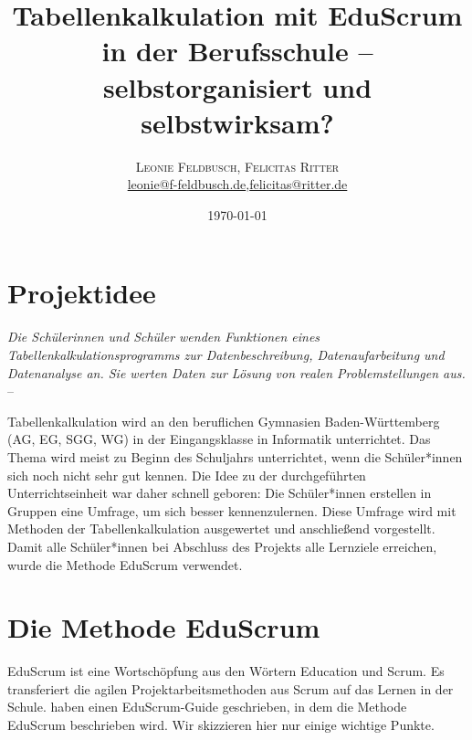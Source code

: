 \documentclass[twoside,twocolumn]{article}
\title{Tabellenkalkulation mit EduScrum in der Berufsschule -- selbstorganisiert und selbstwirksam?} %
\author{%
\textsc{Leonie Feldbusch, Felicitas Ritter} \\[1ex] %
\normalsize \href{mailto:leonie@f-feldbusch.de}{leonie@f-feldbusch.de},\href{mailto:felicitas@ritter.de}{felicitas@ritter.de} %
}
\date{\today} %
\begin{document}
\maketitle


\section{Projektidee}

\textit{Die Schülerinnen und Schüler wenden Funktionen eines Tabellenkalkulationsprogramms zur Datenbeschreibung, Datenaufarbeitung und Datenanalyse an. Sie werten Daten zur Lösung von realen Problemstellungen aus.} -- \cite{BP}

Tabellenkalkulation wird an den beruflichen Gymnasien Baden-Württemberg (AG, EG, SGG, WG) in der Eingangsklasse in Informatik unterrichtet. Das Thema wird meist zu Beginn des Schuljahrs unterrichtet, wenn die Schüler*innen sich noch nicht sehr gut kennen. Die Idee zu der durchgeführten Unterrichtseinheit war daher schnell geboren: Die Schüler*innen erstellen in Gruppen eine Umfrage, um sich besser kennenzulernen. Diese Umfrage wird mit Methoden der Tabellenkalkulation ausgewertet und anschließend vorgestellt. Damit alle Schüler*innen bei Abschluss des Projekts alle Lernziele erreichen, wurde die Methode EduScrum verwendet.


\section{Die Methode EduScrum}

EduScrum ist eine Wortschöpfung aus den Wörtern Education und Scrum. Es transferiert die agilen Projektarbeitsmethoden aus Scrum auf das Lernen in der Schule. \cite{guide} haben einen EduScrum-Guide geschrieben, in dem die Methode EduScrum beschrieben wird. Wir skizzieren hier nur einige wichtige Punkte.
\end{document}
